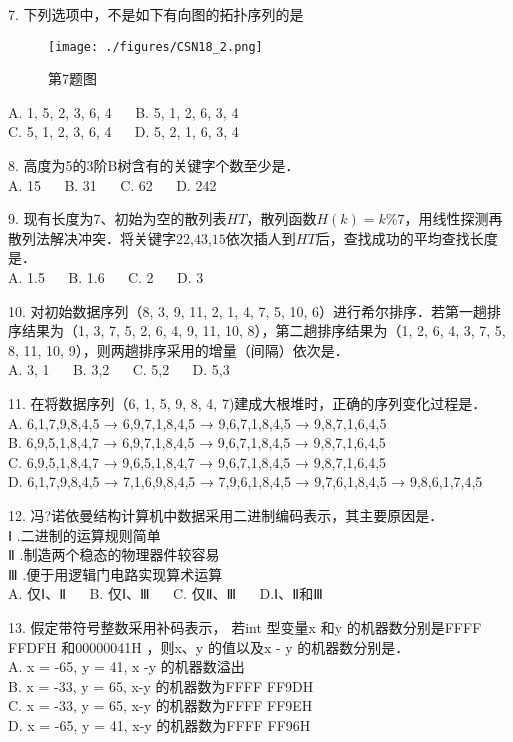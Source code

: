 7. 下列选项中，不是如下有向图的拓扑序列的是 \\
\begin{figure}[ht]
\centering
\texttt{[image: ./figures/CSN18\_2.png]}
\caption{第7题图} \label{CSN18_fig2}
\end{figure}
A. 1, 5, 2, 3, 6, 4  $\quad$ B. 5, 1, 2, 6, 3, 4 \\
C. 5, 1, 2, 3, 6, 4 $\quad$ D. 5, 2, 1, 6, 3, 4

8. 高度为5的3阶B树含有的关键字个数至少是． \\
A. 15 $\quad$ B. 31 $\quad$ C. 62 $\quad$ D. 242

9. 现有长度为$7$、初始为空的散列表$HT$，散列函数$H(k)=k\%7$，用线性探测再散列法解决冲突．将关键字$22$,$43$,$15$依次插人到$HT$后，查找成功的平均查找长度是． \\
A. 1.5 $\quad$ B. 1.6 $\quad$ C. 2 $\quad$ D. 3

10. 对初始数据序列（8, 3, 9, 11, 2, 1, 4, 7, 5, 10, 6）进行希尔排序．若第一趟排序结果为（1,
3, 7, 5, 2, 6, 4, 9, 11, 10, 8），第二趟排序结果为（1, 2, 6, 4, 3, 7, 5, 8, 11, 10, 9），则两趟排序采用的增量（间隔）依次是． \\
A. 3, 1 $\quad$ B. 3,2 $\quad$ C. 5,2 $\quad$ D. 5,3

11. 在将数据序列（6, 1, 5, 9, 8, 4, 7)建成大根堆时，正确的序列变化过程是． \\
A. 6,1,7,9,8,4,5 → 6,9,7,1,8,4,5 → 9,6,7,1,8,4,5 → 9,8,7,1,6,4,5 \\
B. 6,9,5,1,8,4,7 → 6,9,7,1,8,4,5 → 9,6,7,1,8,4,5 → 9,8,7,1,6,4,5 \\
C. 6,9,5,1,8,4,7 → 9,6,5,1,8,4,7 → 9,6,7,1,8,4,5 → 9,8,7,1,6,4,5 \\
D. 6,1,7,9,8,4,5 → 7,1,6,9,8,4,5 → 7,9,6,1,8,4,5 → 9,7,6,1,8,4,5 → 9,8,6,1,7,4,5

12. 冯?诺依曼结构计算机中数据采用二进制编码表示，其主要原因是． \\
Ⅰ .二进制的运算规则简单 \\
Ⅱ .制造两个稳态的物理器件较容易 \\
Ⅲ .便于用逻辑门电路实现算术运算 \\
A. 仅Ⅰ、Ⅱ $\quad$ B. 仅Ⅰ、Ⅲ  $\quad$ C. 仅Ⅱ、Ⅲ $\quad$ D.Ⅰ、Ⅱ和Ⅲ

13. 假定带符号整数采用补码表示， 若int 型变量x 和y 的机器数分别是FFFF FFDFH 和00000041H ，则x、y 的值以及x - y 的机器数分别是． \\
A. x = -65, y = 41, x -y 的机器数溢出 \\
B. x = -33, y = 65, x-y 的机器数为FFFF FF9DH \\
C. x = -33, y = 65, x-y 的机器数为FFFF FF9EH \\
D. x = -65, y = 41, x-y 的机器数为FFFF FF96H

